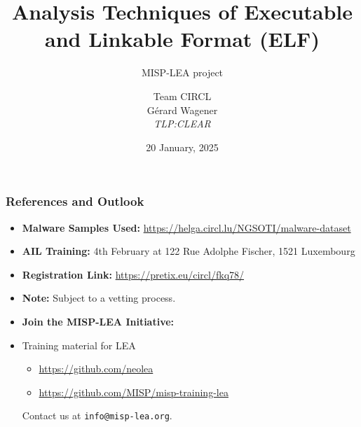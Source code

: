 \documentclass{beamer}
\author{\small{Team CIRCL\\G{\'e}rard Wagener \\ \emph{TLP:CLEAR}}}
\title{Analysis Techniques of Executable and Linkable Format (ELF)}
\subtitle{MISP-LEA project}
\institute{\href{https://www.circl.lu}{https://www.circl.lu} \\}
\date{20 January, 2025}
\begin{document}
\begin{frame}
    \maketitle
\end{frame}








%

\begin{frame}
    \frametitle{References and Outlook}
    \begin{itemize}
        \item \textbf{Malware Samples Used:}
        \url{https://helga.circl.lu/NGSOTI/malware-dataset}
        \item \textbf{AIL Training:}
        4th February at 122 Rue Adolphe Fischer, 1521 Luxembourg
        \item \textbf{Registration Link:}
        \url{https://pretix.eu/circl/fkq78/}
        \item \textbf{Note:} Subject to a vetting process.
        \item \textbf{Join the MISP-LEA Initiative:}
        \item Training material for LEA
        \begin{itemize}
            \item \url{https://github.com/neolea}
            \item \url{https://github.com/MISP/misp-training-lea}
        \end{itemize}
        Contact us at \texttt{info@misp-lea.org}.
    \end{itemize}
\end{frame}
\end{document}
